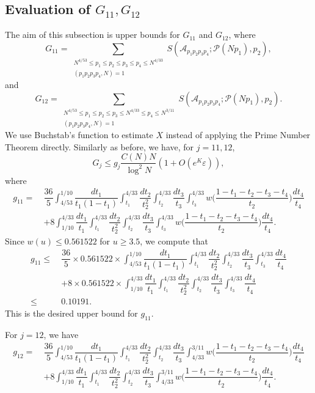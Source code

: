 \documentclass[12pt, a4paper]{amsart}
\def\leq{\leqslant}
\def\geq{\geqslant}
\def\le{\leqslant}
\theoremstyle{plain}
\theoremstyle{remark}
\numberwithin{equation}{section}
\begin{document}
\subsection{Evaluation of $G_{11},G_{12}$}
The aim of this subsection is upper bounds for $G_{11}$ and $G_{12}$, where
\[
G_{11} = \sum_{\substack{N^{4/53} \leq p_1 \le p_2 \le p_3 \le p_4 \le N^{4/33} \\ (p_1 p_2 p_3 p_4, N) = 1}} S(\mathscr{A}_{p_1 p_2 p_3 p_4}; \mathscr{P}(Np_1), p_2),
\] 
and 
\[
G_{12} = \sum_{\substack{N^{4/53} \leq p_1 \le p_2 \le p_3 \le N^{4/33} \leq p_4 \le N^{3/11}\\ (p_1 p_2 p_3 p_4, N) = 1}} S(\mathscr{A}_{p_1 p_2 p_3 p_4}; \mathscr{P}(Np_1), p_2).
\] 
We use Buchstab's function to estimate $X$ instead of applying the Prime Number Theorem directly. 
Similarly as before, we have, for $j=11,12$, 
\begin{equation}\label{G11-12}
G_j \le  g_j \dfrac{C(N)N}{\log^2 N} (1+O(e^K\varepsilon)), 
\end{equation}
where
\begin{equation*}
\begin{aligned}
g_{11}
=\ & \dfrac{36}{5}\int_{4/53}^{1/10}\dfrac{dt_1}{t_1(1-t_1)}\int_{t_1}^{4/33}\dfrac{dt_2}{t_2^2}\int_{t_2}^{4/33}\dfrac{dt_3}{t_3}\int_{t_3}^{4/33}w\bigg(\dfrac{1-t_1-t_2-t_3-t_4}{t_2}\bigg)\dfrac{dt_4}{t_4}\\
&+8\int_{1/10}^{4/33}\dfrac{dt_1}{t_1}\int_{t_1}^{4/33}\dfrac{dt_2}{t_2^2}\int_{t_2}^{4/33}\dfrac{dt_3}{t_3}\int_{t_3}^{4/33}w\bigg(\dfrac{1-t_1-t_2-t_3-t_4}{t_2}\bigg)\dfrac{dt_4}{t_4}. 
\end{aligned}
\end{equation*}
Since $w(u)\le 0.561522$ for $u \geq 3.5$, we compute that 
\begin{equation}\label{g11}
\begin{aligned}
g_{11}
\le\ & \dfrac{36}{5}\times 0.561522\times \int_{4/53}^{1/10}\dfrac{dt_1}{t_1(1-t_1)}\int_{t_1}^{4/33}\dfrac{dt_2}{t_2^2}\int_{t_2}^{4/33}\dfrac{dt_3}{t_3}\int_{t_3}^{4/33}\dfrac{dt_4}{t_4}\\
&+8\times 0.561522\times\int_{1/10}^{4/33}\dfrac{dt_1}{t_1}\int_{t_1}^{4/33}\dfrac{dt_2}{t_2^2}\int_{t_2}^{4/33}\dfrac{dt_3}{t_3}\int_{t_3}^{4/33}\dfrac{dt_4}{t_4}\\
\le\ & 0.10191. 
\end{aligned}
\end{equation}
This is the desired upper bound for $g_{11}$. 

For $j=12$, we have 
\begin{equation*}
\begin{aligned}
g_{12}
=\ &\dfrac{36}{5}\int_{4/53}^{1/10}\dfrac{dt_1}{t_1(1-t_1)}\int_{t_1}^{4/33}\dfrac{dt_2}{t_2^2}\int_{t_2}^{4/33}\dfrac{dt_3}{t_3}\int_{4/33}^{3/11}w\bigg(\dfrac{1-t_1-t_2-t_3-t_4}{t_2}\bigg)\dfrac{dt_4}{t_4}\\
&+8\int_{1/10}^{4/33}\dfrac{dt_1}{t_1}\int_{t_1}^{4/33}\dfrac{dt_2}{t_2^2}\int_{t_2}^{4/33}\dfrac{dt_3}{t_3}\int_{4/33}^{3/11}w\bigg(\dfrac{1-t_1-t_2-t_3-t_4}{t_2}\bigg)\dfrac{dt_4}{t_4}. 
\end{aligned}
\end{equation*}
\end{document}
